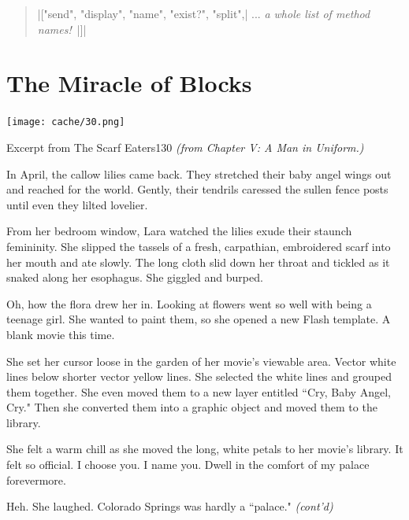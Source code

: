 \documentclass[12pt,twoside]{report}
\begin{document}
\begin{quote}
\rubyinline|["send", "display", "name", "exist?", "split",|
 ... {\em a whole list of method names!}~\rubyinline|]|\end{quote}



\section{The Miracle of Blocks}


	\texttt{[image: cache/30.png]}

	\begin{sidebar}{Excerpt from The Scarf Eaters}{130}
		\textit{(from Chapter V: A Man in Uniform.)}\vspace{6pt}
		
		In April, the callow lilies came back. They stretched their baby angel wings out and reached for the world. Gently, their tendrils caressed the sullen fence posts until even they lilted lovelier.\vspace{6pt}

		From her bedroom window, Lara watched the lilies exude their staunch femininity. She slipped the tassels of a fresh, carpathian, embroidered scarf into her mouth and ate slowly. The long cloth slid down her throat and tickled as it snaked along her esophagus. She giggled and burped.\vspace{6pt}

		Oh, how the flora drew her in. Looking at flowers went so well with being a teenage girl. She wanted to paint them, so she opened a new Flash template. A blank movie this time. \vspace{6pt}
		
		She set her cursor loose in the garden of her movie's viewable area. Vector white lines below shorter vector yellow lines. She selected the white lines and grouped them together. She even moved them to a new layer entitled ``Cry, Baby Angel, Cry." Then she converted them into a graphic object and moved them to the library.\vspace{6pt}
		
		She felt a warm chill as she moved the long, white petals to her movie's library. It felt so official. I choose you. I name you. Dwell in the comfort of my palace forevermore.\vspace{6pt}

		Heh. She laughed. Colorado Springs was hardly a ``palace." \textit{(cont'd)}\vspace{6pt}
	\end{sidebar}
\end{document}
